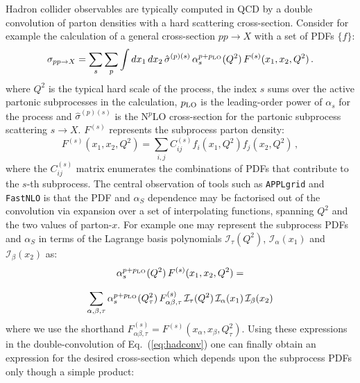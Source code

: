 \documentclass[preprint,12pt]{elsarticle}
\begin{document}
Hadron collider observables are typically computed in QCD by a double
convolution of parton densities with a hard scattering cross-section. Consider for example the calculation of a general cross-section $pp\to X$ with a set of PDFs $\{f\}$:
\begin{equation}\label{eq:hadconv}
  \sigma_{pp\to X} =
  \sum_{s}\sum_{p} \int dx_1\,dx_2\,
  \hat{\sigma}^{(p)(s)}\,\alpha_s^{p+p_{\rm LO}}(Q^2) \,F^{(s)}(x_1,x_2, Q^2)\,.
\end{equation}
where $Q^2$ is the typical hard scale of the process, the index
$s$ sums over the active partonic subprocesses in the calculation, $p_{\rm LO}$ is the leading-order power of $\alpha_s$ for the process
and $\hat{\sigma}^{(p)(s)}$ is the N$^p$LO cross-section for the partonic subprocess scattering $s\to X$. $F^{(s)}$ represents the 
subprocess parton density:
\begin{equation}\label{eq:APPLsubproc}
  F^{(s)}(x_1,x_2, Q^2) =\sum_{i,j} C^{(s)}_{ij} 
  f_i(x_{1},Q^2)f_j(x_{2},Q^2)\,,
\end{equation}
where the $C^{(s)}_{ij}$ matrix enumerates the combinations of PDFs that
contribute to the $s$-th subprocess.
The central observation of tools such as {\tt APPLgrid} and {\tt
  FastNLO} is that the PDF and $\alpha_S$ dependence may be factorised out of
  the convolution via expansion over a set of interpolating functions, spanning $Q^2$ and the
  two values of parton-$x$. For example one may represent the subprocess PDFs and $\alpha_S$ in terms of the Lagrange basis polynomials $\mathcal{I}_\tau(Q^2)$, $\mathcal{I}_\alpha(x_1)$ and $\mathcal{I}_\beta(x_2)$ as:
\begin{equation}\label{eq:interpolation}
\begin{array}{c}
\displaystyle \alpha_s^{p+p_{\rm LO}}(Q^2) \,F^{(s)}(x_1,x_2, Q^2)
  =\\
\\
\displaystyle \sum_{\alpha,\beta,\tau} \alpha_s^{p+p_{\rm LO}}(Q_\tau^2)
  \,F^{(s)}_{\alpha\beta , \tau}
  \,\mathcal{I}_\tau(Q^2)\,\mathcal{I}_\alpha(x_1)
  \,\mathcal{I}_\beta(x_2)
\end{array}
\end{equation}
where we use the shorthand $F^{(s)}_{\alpha\beta ,\tau} = F^{(s)}(x_\alpha, x_\beta,Q_\tau^2)$.
Using these expressions in the double-convolution of Eq.~(\ref{eq:hadconv}) one can finally obtain an expression for the desired
cross-section which depends upon the subprocess PDFs only though a simple product:
\end{document}
